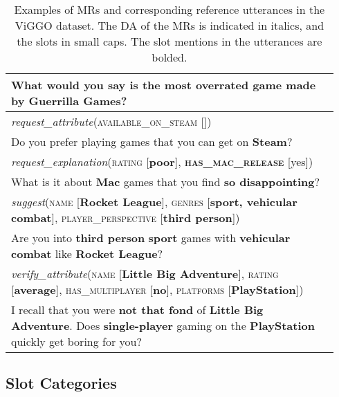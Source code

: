 \documentclass[11pt,a4paper]{article}
\begin{document}
\begin{table}
\begin{tabular}{p{0.94\linewidth}}
        \hline
    	What would you say is the most \textbf{overrated} game made by \textbf{Guerrilla Games}? \\
        \hline
    	\rowcolor{light-gray}
    	\emph{request\_attribute}(\textsc{available\_on\_steam} []) \\
        \hline
    	Do you prefer playing games that you can get on \textbf{Steam}? \\
        \hline
    	\rowcolor{light-gray}
    	\emph{request\_explanation}(\textsc{rating} [\textbf{poor}], \textsc{\textbf{has\_mac\_re\-lease}} [yes]) \\
        \hline
    	What is it about \textbf{Mac} games that you find \textbf{so disappointing}? \\
        \hline
    	\rowcolor{light-gray}
    	\emph{suggest}(\textsc{name} [\textbf{Rocket League}], \textsc{genres} [\textbf{sport, vehicular combat}], \textsc{player\_perspective} [\textbf{third person}]) \\
        \hline
    	Are you into \textbf{third person} \textbf{sport} games with \textbf{vehicular combat} like \textbf{Rocket League}? \\
        \hline
    	\rowcolor{light-gray}
    	\emph{verify\_attribute}(\textsc{name} [\textbf{Little Big Adventure}], \textsc{rating} [\textbf{average}], \textsc{has\_multiplayer} [\textbf{no}], \textsc{platforms} [\textbf{PlayStation}]) \\
        \hline
    	I recall that you were \textbf{not that fond} of \textbf{Little Big Adventure}. Does \textbf{single-player} gaming on the \textbf{PlayStation} quickly get boring for you? \\
        \hline
    \end{tabular}
	\caption{Examples of MRs and corresponding reference utterances in the ViGGO dataset. The DA of the MRs is indicated in italics, and the slots in small caps. The slot mentions in the utterances are bolded.}
    \label{tab:ex_video_game_dataset_full}
\end{table}


\subsection{Slot Categories}
\end{document}
